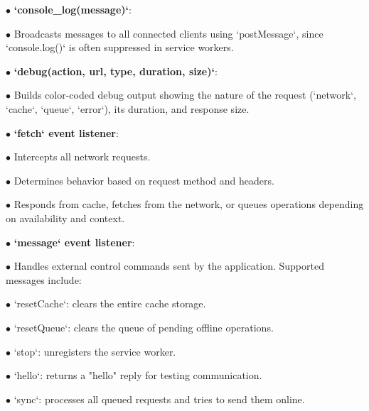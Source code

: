 \documentclass[a4paper]{article}
\begin{document}
\begin{compactitem}
\item[\color{myblue}$\bullet$] \textbf{`console\_log(message)`}:
  \begin{compactitem}
  \item[\color{myblue}$\bullet$] Broadcasts messages to all connected clients using `postMessage`, since `console.log()` is often suppressed in service workers.
  \end{compactitem}
\item[\color{myblue}$\bullet$] \textbf{`debug(action, url, type, duration, size)`}:
  \begin{compactitem}
  \item[\color{myblue}$\bullet$] Builds color-coded debug output showing the nature of the request (`network`, `cache`, `queue`, `error`), its duration, and response size.
  \end{compactitem}
\item[\color{myblue}$\bullet$] \textbf{`fetch` event listener}:
  \begin{compactitem}
  \item[\color{myblue}$\bullet$] Intercepts all network requests.
  \item[\color{myblue}$\bullet$] Determines behavior based on request method and headers.
  \item[\color{myblue}$\bullet$] Responds from cache, fetches from the network, or queues operations depending on availability and context.
  \end{compactitem}
\item[\color{myblue}$\bullet$] \textbf{`message` event listener}:
  \begin{compactitem}
  \item[\color{myblue}$\bullet$] Handles external control commands sent by the application. Supported messages include:
    \begin{compactitem}
    \item[\color{myblue}$\bullet$] `resetCache`: clears the entire cache storage.
    \item[\color{myblue}$\bullet$] `resetQueue`: clears the queue of pending offline operations.
    \item[\color{myblue}$\bullet$] `stop`: unregisters the service worker.
    \item[\color{myblue}$\bullet$] `hello`: returns a "hello" reply for testing communication.
    \item[\color{myblue}$\bullet$] `sync`: processes all queued requests and tries to send them online.
    \end{compactitem}
  \end{compactitem}
\end{compactitem}
\end{document}
